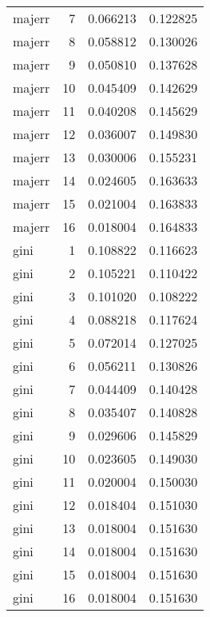 \begin{longtable}{lrrr}
  majerr &          7 &     0.066213 &    0.122825 \\
  majerr &          8 &     0.058812 &    0.130026 \\
  majerr &          9 &     0.050810 &    0.137628 \\
  majerr &         10 &     0.045409 &    0.142629 \\
  majerr &         11 &     0.040208 &    0.145629 \\
  majerr &         12 &     0.036007 &    0.149830 \\
  majerr &         13 &     0.030006 &    0.155231 \\
  majerr &         14 &     0.024605 &    0.163633 \\
  majerr &         15 &     0.021004 &    0.163833 \\
  majerr &         16 &     0.018004 &    0.164833 \\
    gini &          1 &     0.108822 &    0.116623 \\
    gini &          2 &     0.105221 &    0.110422 \\
    gini &          3 &     0.101020 &    0.108222 \\
    gini &          4 &     0.088218 &    0.117624 \\
    gini &          5 &     0.072014 &    0.127025 \\
    gini &          6 &     0.056211 &    0.130826 \\
    gini &          7 &     0.044409 &    0.140428 \\
    gini &          8 &     0.035407 &    0.140828 \\
    gini &          9 &     0.029606 &    0.145829 \\
    gini &         10 &     0.023605 &    0.149030 \\
    gini &         11 &     0.020004 &    0.150030 \\
    gini &         12 &     0.018404 &    0.151030 \\
    gini &         13 &     0.018004 &    0.151630 \\
    gini &         14 &     0.018004 &    0.151630 \\
    gini &         15 &     0.018004 &    0.151630 \\
    gini &         16 &     0.018004 &    0.151630 \\
\end{longtable}

